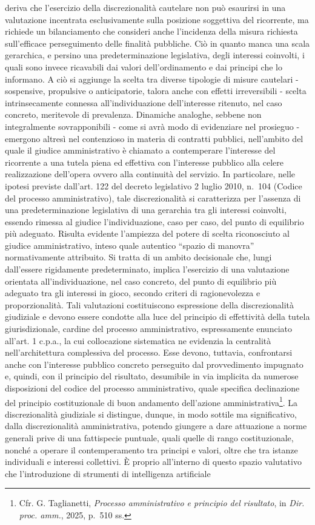 \documentclass[american,a4paper,]{article}
\begin{document}
{deriva che l'esercizio della discrezionalità cautelare non può esaurirsi in una valutazione incentrata esclusivamente sulla posizione soggettiva del ricorrente, ma richiede un bilanciamento che consideri anche l'incidenza della misura richiesta sull'efficace perseguimento delle finalità pubbliche. Ciò in quanto manca una scala gerarchica, e persino una predeterminazione legislativa, degli interessi coinvolti, i quali sono invece ricavabili dai valori dell'ordinamento e dai principi che lo informano. A ciò si aggiunge la scelta tra diverse tipologie di misure cautelari - sospensive, propulsive o anticipatorie, talora anche con effetti irreversibili - scelta intrinsecamente connessa all'individuazione dell'interesse ritenuto, nel caso concreto, meritevole di prevalenza. Dinamiche analoghe, sebbene non integralmente sovrapponibili - come si avrà modo di evidenziare nel prosieguo - emergono altresì nel contenzioso in materia di contratti pubblici, nell'ambito del quale il giudice amministrativo è chiamato a contemperare l'interesse del ricorrente a una tutela piena ed effettiva con l'interesse pubblico alla celere realizzazione dell'opera ovvero alla continuità del servizio. In particolare, nelle ipotesi previste dall'art. 122 del decreto legislativo 2 luglio 2010, n.~104 (Codice del processo amministrativo), tale discrezionalità si caratterizza per l'assenza di una predeterminazione legislativa di una gerarchia tra gli interessi coinvolti, essendo rimessa al giudice l'individuazione, caso per caso, del punto di equilibrio più adeguato. Risulta evidente l'ampiezza del potere di scelta riconosciuto al giudice amministrativo, inteso quale autentico ``spazio di manovra'' normativamente attribuito. Si tratta di un ambito decisionale che, lungi dall'essere rigidamente predeterminato, implica l'esercizio di una valutazione orientata all'individuazione, nel caso concreto, del punto di equilibrio più adeguato tra gli interessi in gioco, secondo criteri di ragionevolezza e proporzionalità. Tali valutazioni costituiscono espressione della discrezionalità giudiziale e devono essere condotte alla luce del principio di effettività della tutela giurisdizionale, cardine del processo amministrativo, espressamente enunciato all'art. 1 c.p.a., la cui collocazione sistematica ne evidenzia la centralità nell'architettura complessiva del processo. Esse devono, tuttavia, confrontarsi anche con l'interesse pubblico concreto perseguito dal provvedimento impugnato e, quindi, con il principio del risultato, desumibile in via implicita da numerose disposizioni del codice del processo amministrativo, quale specifica declinazione del principio costituzionale di buon andamento dell'azione amministrativa\footnote{Cfr. G. Taglianetti, \emph{Processo amministrativo e principio del risultato}, in \emph{Dir. proc. amm.}, 2025, p.~510 ss.}. La discrezionalità giudiziale si distingue, dunque, in modo sottile ma significativo, dalla discrezionalità amministrativa, potendo giungere a dare attuazione a norme generali prive di una fattispecie puntuale, quali quelle di rango costituzionale, nonché a operare il contemperamento tra principi e valori, oltre che tra istanze individuali e interessi collettivi. È proprio all'interno di questo spazio valutativo che l'introduzione di strumenti di intelligenza artificiale }
\end{document}
